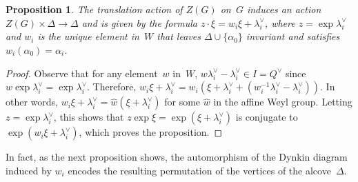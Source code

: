 \documentclass[11pt]{article}
\numberwithin{equation}{section}
\newtheorem{Proposition}[Theorem]{Proposition}
{\theoremstyle{definition}
\newtheorem{Definition}[Theorem]{Definition}
\newtheorem{Example}[Theorem]{Example}
\newtheorem{Remark}[Theorem]{Remark}
}
\begin{document}
\begin{Proposition}
\label{prop:action}
The translation action of $Z(G)$ on~$G$ induces an action $Z(G) \times \Delta \to \Delta$ and is given by the formula
$z\cdot \xi = w_i \xi + \lambda_i^\vee$, where $z=\exp \lambda_i^\vee$ and $w_i$ is the unique element in~$W$ that
leaves $\Delta \cup \{{\alpha_0} \}$ invariant and satisfies $w_i({\alpha_0}) = \alpha_i$.
\end{Proposition}

\begin{proof}
Observe that for any element~$w$ in~$W$, $w \lambda_i^\vee - \lambda_i^\vee \in I= Q^\vee$ since $w\exp\lambda_i^\vee =
\exp \lambda_i^\vee$.
Therefore, $w_i \xi + \lambda_i^\vee = w_i(\xi + \lambda_i^\vee + (w_i^{-1}\lambda_i^\vee - \lambda_i^\vee))$.
In other words, $w_i \xi + \lambda_i^\vee = \hat{w}(\xi+\lambda_i^\vee)$ for some $\hat{w}$ in the af\/f\/ine Weyl group.
Letting $z=\exp\lambda_i^\vee$, this shows that $z \exp \xi = \exp(\xi+\lambda_i^\vee)$ is conjugate to $\exp(w_i \xi
+\lambda^\vee_i)$, which proves the proposition.
\end{proof}

In fact, as the next proposition shows, the automorphism of the Dynkin diagram induced by $w_i$ encodes the resulting
permutation of the vertices of the alcove~$\Delta$.
\end{document}
